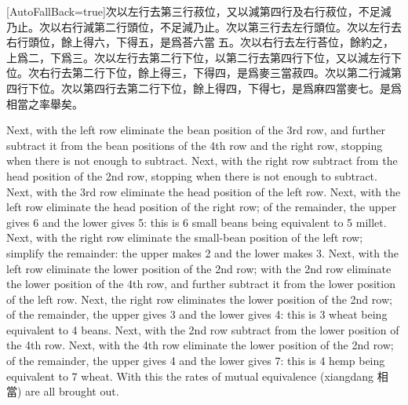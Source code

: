\documentclass[11pt]{article}
\newcommand{\unitlabel}[1]{\marginpar{\raggedleft\tiny\color{gray}#1}}
\newenvironment{unitzh}{\par\CJKfontspec{Noto Serif CJK SC}[AutoFallBack=true]\large\linespread{1.25}\selectfont}{\par}
\newenvironment{uniten}{\par\small\color{black!85}}{\par\medskip}
\begin{document}
\begin{unitzh}\unitlabel{jiuzhang-037.9}次以左行去第三行菽位，又以減第四行及右行菽位，不足減乃止。次以右行減第二行頭位，不足減乃止。次以第三行去左行頭位。次以左行去右行頭位，餘上得六，下得五，是爲荅六當𮮐五。次以右行去左行荅位，餘約之，上爲二，下爲三。次以左行去第二行下位，以第二行去第四行下位，又以減左行下位。次右行去第二行下位，餘上得三，下得四，是爲麥三當菽四。次以第二行減第四行下位。次以第四行去第二行下位，餘上得四，下得七，是爲麻四當麥七。是爲相當之率舉矣。\end{unitzh}
\begin{uniten}Next, with the left row eliminate the bean position of the 3rd row, and further subtract it from the bean positions of the 4th row and the right row, stopping when there is not enough to subtract. Next, with the right row subtract from the head position of the 2nd row, stopping when there is not enough to subtract. Next, with the 3rd row eliminate the head position of the left row. Next, with the left row eliminate the head position of the right row; of the remainder, the upper gives 6 and the lower gives 5: this is 6 small beans being equivalent to 5 millet. Next, with the right row eliminate the small-bean position of the left row; simplify the remainder: the upper makes 2 and the lower makes 3. Next, with the left row eliminate the lower position of the 2nd row; with the 2nd row eliminate the lower position of the 4th row, and further subtract it from the lower position of the left row. Next, the right row eliminates the lower position of the 2nd row; of the remainder, the upper gives 3 and the lower gives 4: this is 3 wheat being equivalent to 4 beans. Next, with the 2nd row subtract from the lower position of the 4th row. Next, with the 4th row eliminate the lower position of the 2nd row; of the remainder, the upper gives 4 and the lower gives 7: this is 4 hemp being equivalent to 7 wheat. With this the rates of mutual equivalence (xiangdang 相當) are all brought out.\end{uniten}
\end{document}
